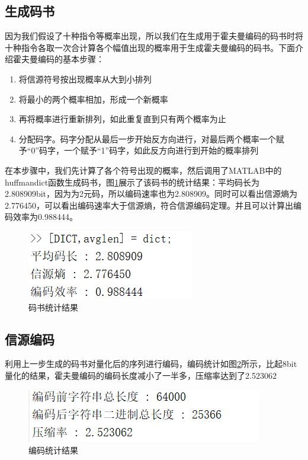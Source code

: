 \documentclass{../source/zju}
\begin{document}
        \subsection{生成码书}
        因为我们假设了十种指令等概率出现，所以我们在生成用于霍夫曼编码的码书时将十种指令各取一次合计算各个幅值出现的概率用于生成霍夫曼编码的码书。下面介绍霍夫曼编码的基本步骤：
            \begin{enumerate}
                \item 将信源符号按出现概率从大到小排列
                \item 将最小的两个概率相加，形成一个新概率
                \item 再将概率进行重新排列，如此重复直到只有两个概率为止
                \item 分配码字。码字分配从最后一步开始反方向进行，对最后两个概率一个赋予“0”码字，一个赋予“1”码字，如此反方向进行到开始的概率排列
            \end{enumerate}
        在本步骤中，我们先计算了各个符号出现的概率，然后调用了MATLAB中的huffmandict函数生成码书，图\ref{码书统计}展示了该码书的统计结果：平均码长为2.808909bit，因为为2元码，所以编码速率也为2.808909。同时可以看出信源熵为2.776450，可以看出编码速率大于信源熵，符合信源编码定理。并且可以计算出编码效率为0.988444。
        \begin{figure}[H]
            \centering
            \includegraphics[]{figure/码书统计.png}
            \caption{码书统计结果}
            \label{码书统计}
        \end{figure}

        \subsection{信源编码}
        利用上一步生成的码书对量化后的序列进行编码，编码统计如图\ref{编码统计}所示，比起8bit量化的结果，霍夫曼编码的编码长度减小了一半多，压缩率达到了2.523062
        \begin{figure}[H]
            \centering
            \includegraphics[]{figure/编码统计.png}
            \caption{编码统计结果}
            \label{编码统计}
        \end{figure}
\end{document}
